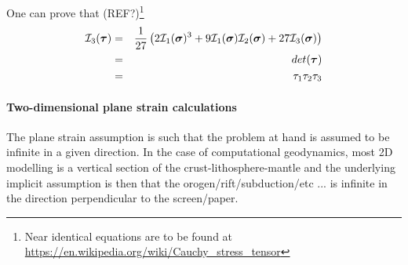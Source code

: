 \vspace{1cm}

{\color{gray} 
One can prove that (REF?)\footnote{Near identical equations are to be found at 
\url{https://en.wikipedia.org/wiki/Cauchy_stress_tensor}} 
\begin{eqnarray}
{\cal I}_3({\bm \tau}) 
&=& \frac{1}{27} \left( 2 {\cal I}_1({\bm \sigma})^3 + 
9 {\cal I}_1({\bm \sigma}) {\cal I}_2({\bm \sigma}) 
+27 {\cal I}_3({\bm \sigma})   \right) \nonumber\\
&=& det ({\bm\tau}) \nonumber\\
&=& \tau_1 \tau_2\tau_3 \nonumber\\
\end{eqnarray}
}

\paragraph{Two-dimensional plane strain calculations} 

The plane strain assumption is such that the problem at hand is assumed to be infinite in a given direction. 
In the case of computational geodynamics, most 2D modelling is a vertical section of the crust-lithosphere-mantle
and the underlying implicit assumption is then that the orogen/rift/subduction/etc ... is infinite in the 
direction perpendicular to the screen/paper. 

